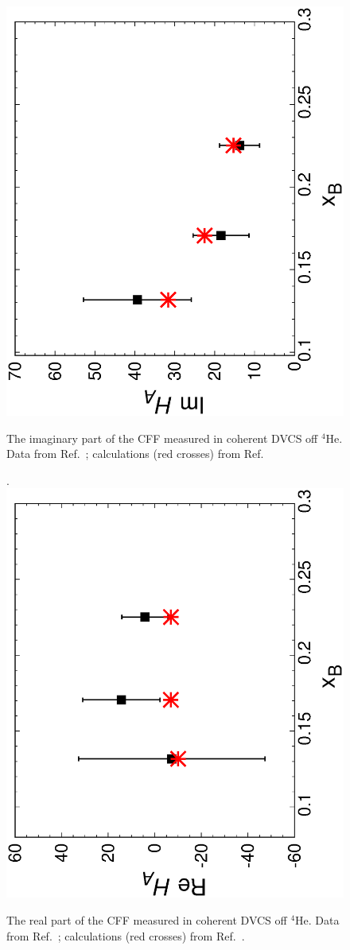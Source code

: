 \documentclass[times, twoside]{PosWhiPap}
\begin{document}
\begin{figure}[tbhp]
\centering
\includegraphics[width=.7\linewidth, angle=270]{Figures/imxb.eps}
\caption{The imaginary part of the CFF measured in coherent DVCS off $^4$He.
Data from Ref.~\cite{Hattawy:2017woc}; calculations (red crosses) from
Ref.~\cite{Fucini:2018gso}}.
\label{uno}
\includegraphics[width=.7\linewidth, angle=270]{Figures/rexb.eps}
\caption{ The real part of the CFF measured in coherent DVCS off $^4$He.
Data from Ref.~\cite{Hattawy:2017woc}; calculations (red crosses) from
Ref.~\cite{Fucini:2018gso}. }
\label{due}
\end{figure}
\end{document}
